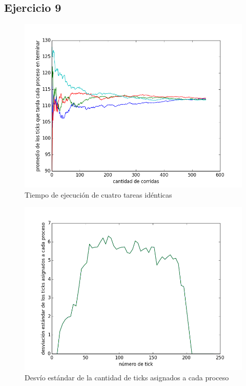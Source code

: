 \documentclass[a4paper]{article}
\begin{document}
\subsection{Ejercicio 9}

\begin{figure}[H]
\centering
\includegraphics[scale=0.66]{../experimentacion/ej9-fairness/tiempo_final/prueba-tiempo-final.png}
\caption{Tiempo de ejecución de cuatro tareas idénticas}
\end{figure}

\begin{figure}[H]
\centering
\includegraphics[scale=0.66]{../experimentacion/ej9-fairness/fairness/plot.png}
\caption{Desvío estándar de la cantidad de ticks asignados a cada proceso}
\end{figure}
\end{document}
